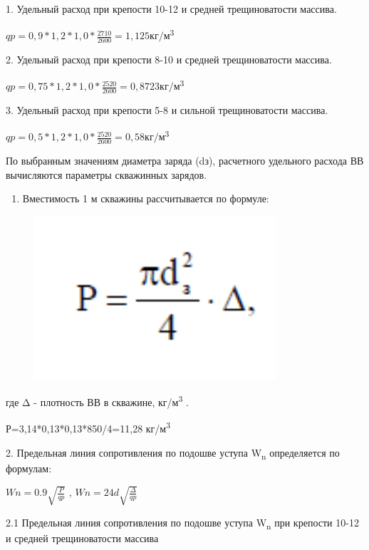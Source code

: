 1. Удельный расход при крепости 10-12 и средней трещиноватости массива.

\(qp = 0,9*1,2*1,0*\frac{2710}{2600} = 1,125кг/м\)\textsuperscript{3}

2. Удельный расход при крепости 8-10 и средней трещиноватости массива.

\(qp = 0,75*1,2*1,0*\frac{2520}{2600} = 0,8723кг/м\)\textsuperscript{3}

3. Удельный расход при крепости 5-8 и сильной трещиноватости массива.

\(qp = 0,5*1,2*1,0*\frac{2520}{2600} = 0,58кг/м\)\textsuperscript{3}

По выбранным значениям диаметра заряда (dз), расчетного удельного
расхода ВВ вычисляются параметры скважинных зарядов.

\begin{enumerate}
\def\labelenumi{\arabic{enumi}.}
\item
  Вместимость 1 м скважины рассчитывается по формуле:
\end{enumerate}

\begin{figure}[H]
	\centering
	\includegraphics[width=0.8\textwidth]{media/gor/image28}
	\caption*{}
\end{figure}


где Δ - плотность ВВ в скважине, кг/м\textsuperscript{3} .

Р=3,14*0,13*0,13*850/4=11,28 кг/м\textsuperscript{3}

2. Предельная линия сопротивления по подошве уступа W\textsubscript{n}
определяется по формулам:

\(Wn = 0.9\sqrt{\frac{P}{qp}}\) , \(Wn = 24d\sqrt{\frac{\Delta}{qp}}\)

2.1 Предельная линия сопротивления по подошве уступа W\textsubscript{n}
при крепости 10-12 и средней трещиноватости массива

